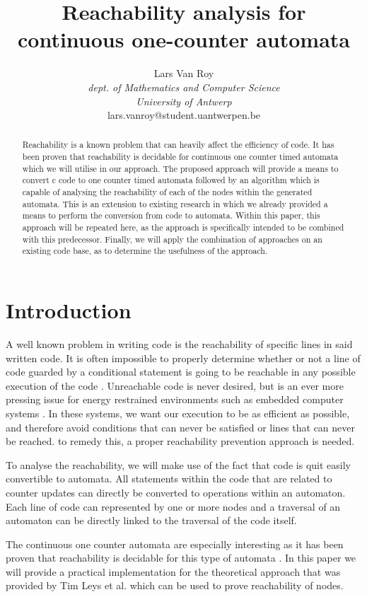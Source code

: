 \documentclass[12pt]{article}
\title{Reachability analysis for continuous one-counter automata}
\author{Lars Van Roy\\
\textit{dept. of Mathematics and Computer Science} \\
\textit{University of Antwerp}\\
lars.vanroy@student.uantwerpen.be}
\begin{document}
\maketitle{}

\begin{abstract}
\noindent
Reachability is a known problem that can heavily affect the efficiency of code. It has been proven that reachability is decidable for continuous one counter timed automata which we will utilise in our approach. The proposed approach will provide a means to convert c code to one counter timed automata followed by an algorithm which is capable of analysing the reachability of each of the nodes within the generated automata. This is an extension to existing research in which we already provided a means to perform the conversion from code to automata. Within this paper, this approach will be repeated here, as the approach is specifically intended to be combined with this predecessor. Finally, we will apply the combination of approaches on an existing code base, as to determine the usefulness of the approach.

\end{abstract}

\section{Introduction}
A well known problem in writing code is the reachability of specific lines in said written code. It is often impossible to properly determine whether or not a line of code guarded by a conditional statement is going to be reachable in any possible execution of the code \cite{713323, 10.1145/1292316.1292319}. Unreachable code is never desired, but is an ever more pressing issue for energy restrained environments such as embedded computer systems \cite{embeddedefficiency}. In these systems, we want our execution to be as efficient as possible, and therefore avoid conditions that can never be satisfied or lines that can never be reached. to remedy this, a proper reachability prevention approach is needed.

To analyse the reachability, we will make use of the fact that code is quit easily convertible to automata. All statements within the code that are related to counter updates can directly be converted to operations within an automaton. Each line of code can represented by one or more nodes and a traversal of an automaton can be directly linked to the traversal of the code itself.

The continuous one counter automata are especially interesting as it has been proven that reachability is decidable for this type of automata \cite{succintandparametriconecounter, danialandjoel, blondin2021continuous}. In this paper we will provide a practical implementation for the theoretical approach that was provided by Tim Leys et al.\cite{blondin2021continuous} which can be used to prove reachability of nodes. 
\end{document}
